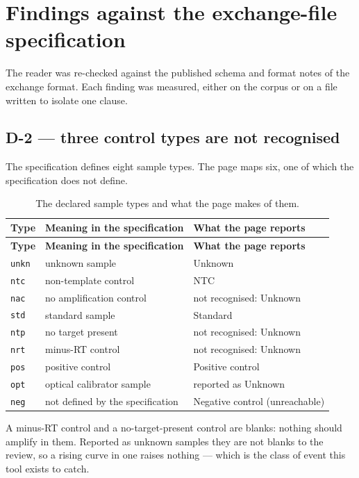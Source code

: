 \section{Findings against the exchange-file specification}
The reader was re-checked against the published schema and format notes of the
exchange format. Each finding was measured, either on the corpus or on a file
written to isolate one clause.

\subsection*{D-2 --- three control types are not recognised}
The specification defines eight sample types. The page maps six, one of which the
specification does not define.

{\small
\begin{xltabular}{\linewidth}{|X|l|l|}
\caption{The declared sample types and what the page makes of them.}\label{tab:d2-vocabulary} \\
\toprule \textbf{Type} & \textbf{Meaning in the specification} & \textbf{What the page reports} \\\midrule\endfirsthead
\toprule \textbf{Type} & \textbf{Meaning in the specification} & \textbf{What the page reports} \\\midrule\endhead
\texttt{unkn} & unknown sample & Unknown \\
\texttt{ntc} & non-template control & NTC \\
\texttt{nac} & no amplification control & not recognised: Unknown \\
\texttt{std} & standard sample & Standard \\
\texttt{ntp} & no target present & not recognised: Unknown \\
\texttt{nrt} & minus-RT control & not recognised: Unknown \\
\texttt{pos} & positive control & Positive control \\
\texttt{opt} & optical calibrator sample & reported as Unknown \\
\texttt{neg} & not defined by the specification & Negative control (unreachable) \\
\bottomrule
\end{xltabular}}


A minus-RT control and a no-target-present control are blanks: nothing should
amplify in them. Reported as unknown samples they are not blanks to the review, so
a rising curve in one raises nothing --- which is the class of event this tool
exists to catch.

